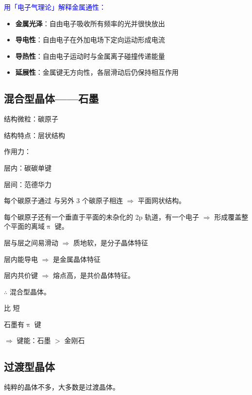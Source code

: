             \textcolor{blue}{用「电子气理论」解释金属通性：}

            \begin{itemize}
                \item \textbf{金属光泽}：自由电子吸收所有频率的光并很快放出
                \item \textbf{导电性}：自由电子在外加电场下定向运动形成电流
                \item \textbf{导热性}：自由电子运动时与金属离子碰撞传递能量
                \item \textbf{延展性}：金属键无方向性，各层滑动后仍保持相互作用
            \end{itemize}

        \subsection{混合型晶体——石墨}\label{subsec:混合型晶体石墨}

            结构微粒：碳原子

            结构特点：层状结构

            作用力：

            层内：碳碳单键

            层间：范德华力

            每个碳原子通过  与另外 3 个碳原子相连 \(\Rightarrow\) 平面网状结构。

            每个碳原子还有一个垂直于平面的未杂化的 2p 轨道，有一个电子 \(\Rightarrow\) 形成覆盖整个平面的离域\(\uppi\) 键。

            层与层之间易滑动 \(\Rightarrow\) 质地软，是分子晶体特征

            层内能导电 \(\Rightarrow\) 是金属晶体特征

            层内共价键 \(\Rightarrow\) 熔点高，是共价晶体特征。

            \(\therefore\) 混合型晶体。

              比  短

             石墨有\(\uppi\) 键

            \(\Rightarrow\) 键能：石墨 \(>\) 金刚石

        \subsection{过渡型晶体}\label{subsec:过渡型晶体}

            纯粹的晶体不多，大多数是过渡晶体。

